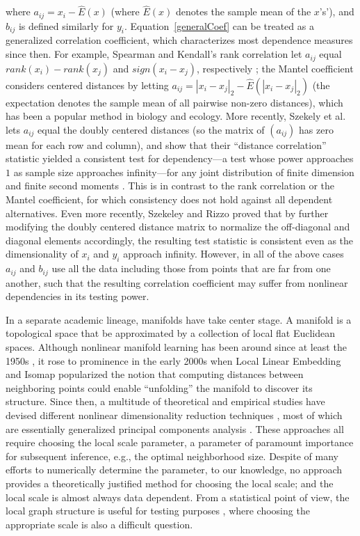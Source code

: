 \documentclass[11pt]{article}
\begin{document}
where $a_{ij}=x_i - \hat{E}(x)$ (where $\hat{E}(x)$ denotes the sample mean of the $x$'s'), and $b_{ij}$ is defined similarly for $y_i$.  Equation~\ref{generalCoef} can be treated as a generalized correlation coefficient, which characterizes most dependence measures since then.  For example, Spearman and Kendall's rank correlation let $a_{ij}$ equal $rank(x_i)-rank(x_j)$ and $sign(x_i-x_j)$, respectively \cite{KendallBook}; the Mantel coefficient \cite{Mantel1967} considers centered distances by letting $a_{ij}=|x_i-x_j|_{2}-\hat{E}(|x_i-x_j|_{2})$ (the expectation denotes the sample mean of all pairwise non-zero distances), which has been a popular method in biology and ecology. More recently, Szekely et al. \cite{SzekelyRizzoBakirov2007} lets $a_{ij}$ equal the doubly centered distances (so the matrix of $(a_{ij})$ has zero mean for each row and column), and show that their ``distance correlation'' statistic yielded a consistent test for dependency---a test whose power approaches $1$ as sample size approaches infinity---for any joint distribution of finite dimension and finite second moments \cite{SzekelyRizzo2009}. This is in contrast to the rank correlation or the Mantel coefficient, for which consistency does not hold against all dependent alternatives. 
Even more recently, Szekeley and Rizzo \cite{SzekelyRizzo2013a} proved that by further modifying the doubly centered distance matrix to normalize the off-diagonal and diagonal elements accordingly, the resulting test statistic is consistent even as the dimensionality of $x_{i}$ and $y_{i}$ approach infinity.  However, in all of the above cases $a_{ij}$ and $b_{ij}$ use all the data including those from points that are far from one another, such that the resulting correlation coefficient may suffer from nonlinear dependencies in its testing power.

In a separate academic lineage, manifolds have take center stage.  A manifold is a topological space that be approximated by a collection of local flat Euclidean spaces.  Although nonlinear manifold learning has been around since at least the 1950s \cite{TorgersonBook}, it rose to prominence in the early 2000s when Local Linear Embedding \cite{SaulRoweis2000} and Isomap \cite{TenenbaumSilvaLangford2000} popularized the notion that computing distances between neighboring points could enable ``unfolding'' the manifold to discover its structure.  Since then, a multitude of theoretical and empirical studies have devised different nonlinear dimensionality reduction techniques \cite{LeeVerleysen2007}, most of which are essentially generalized principal components analysis \cite{ScholkopfSmolaMuller1999}.  These approaches all require choosing the local scale parameter, a parameter of paramount importance for subsequent inference, e.g., the optimal neighborhood size. Despite of many efforts to numerically determine the parameter, to our knowledge, no approach provides a theoretically justified method for choosing the local scale; and the local scale is almost always data dependent. From a statistical point of view, the local graph structure is useful for testing purposes \cite{David1966,Friedman1983,Schilling1986,Dumcke2014}, where choosing the appropriate scale is also a difficult question.
\end{document}
